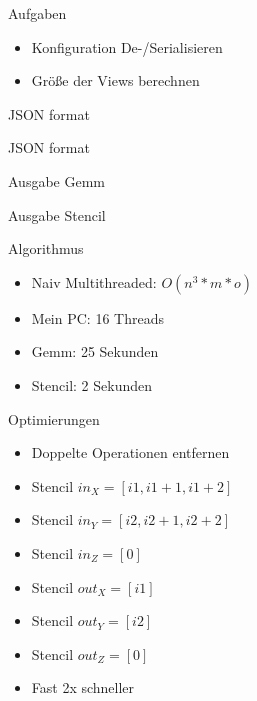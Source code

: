 \documentclass{../presentation}
\begin{document}
\frame[plain]{\titlepage}

\begin{frame}{Aufgaben}
    \begin{itemize}
        \item Konfiguration De-/Serialisieren
        \item Größe der Views berechnen
    \end{itemize}
\end{frame}

\begin{frame}{JSON format}
    
\end{frame}

\begin{frame}{JSON format}
    
\end{frame}

\begin{frame}{Ausgabe Gemm}
    
\end{frame}

\begin{frame}{Ausgabe Stencil}
    
\end{frame}

\begin{frame}{Algorithmus}
    \begin{itemize}
        \item Naiv Multithreaded: $O(n^3 * m * o)$
        \item Mein PC: 16 Threads
        \item Gemm: 25 Sekunden
        \item Stencil: 2 Sekunden
    \end{itemize}
\end{frame}


\begin{frame}{Optimierungen}
    \begin{itemize}
        \item Doppelte Operationen entfernen
        \item Stencil $in_X = [i1, i1+1, i1+2]$
        \item Stencil $in_Y = [i2, i2+1, i2+2]$
        \item Stencil $in_Z = [0]$
        \item Stencil $out_X = [i1]$
        \item Stencil $out_Y = [i2]$
        \item Stencil $out_Z = [0]$
        \item Fast 2x schneller
    \end{itemize}
\end{frame}
\end{document}
